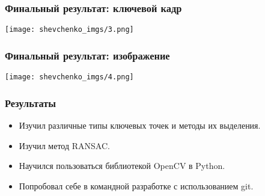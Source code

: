 \begin{frame}\frametitle{Финальный результат: ключевой кадр}
    \begin{center}
        \texttt{[image: shevchenko\_imgs/3.png]}
    \end{center}
\end{frame}
\begin{frame}\frametitle{Финальный результат: изображение}
    \begin{center}
        \texttt{[image: shevchenko\_imgs/4.png]}
    \end{center}
\end{frame}

\begin{frame}\frametitle{Результаты}
    \begin{itemize}
        \item Изучил различные типы ключевых точек и методы их выделения.
        \item Изучил метод RANSAC.
        \item Научился пользоваться библиотекой OpenCV в Python.
        \item Попробовал себе в командной разработке с использованием git.
    \end{itemize}
\end{frame}




